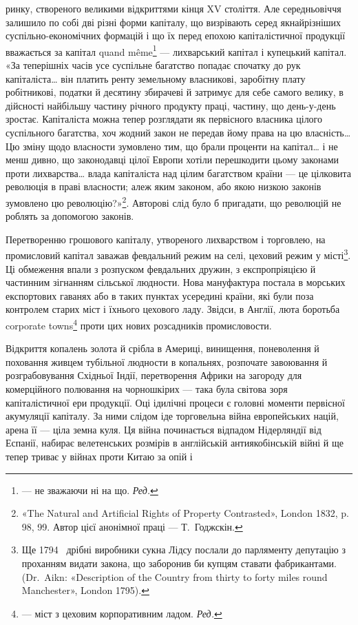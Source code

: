 \parcont{}  %
ринку, створеного великими відкриттями кінця XV століття.
Але середньовіччя залишило по собі дві різні форми капіталу,
що визрівають серед якнайрізніших суспільно-економічних
формацій і що їх перед епохою капіталістичної продукції вважається
за капітал quand même\footnote*{
— не зважаючи ні на що. \emph{Ред.}
} — лихварський капітал і купецький
капітал. «За теперішніх часів усе суспільне багатство
попадає спочатку до рук капіталіста\dots{} він платить ренту земельному
власникові, заробітну плату робітникові, податки й десятину
збирачеві й затримує для себе самого велику, в дійсності
найбільшу частину річного продукту праці, частину, що день-у-день
зростає. Капіталіста можна тепер розглядати як первісного
власника цілого суспільного багатства, хоч жодний закон
не передав йому права на цю власність\dots{} Цю зміну щодо власности
зумовлено тим, що брали проценти на капітал\dots{} і не менш
дивно, що законодавці цілої Европи хотіли перешкодити цьому
законами проти лихварства\dots{} влада капіталіста над цілим багатством
країни — це цілковита революція в праві власности;
алеж яким законом, або якою низкою законів зумовлено цю
революцію?»\footnote{
«The Natural and Artificial Rights of Property Contrasted», London
1832, p. 98, 99. Автор цієї анонімної праці — Т.~Годжскін.
}. Авторові слід було б пригадати, що революцій
не роблять за допомогою законів.

Перетворенню грошового капіталу, утвореного лихварством
і торговлею, на промисловий капітал заважав февдальний режим
на селі, цеховий режим у місті\footnote{
Ще 1794~ дрібні виробники сукна Лідсу послали до парляменту
депутацію з проханням видати закона, що заборонив би купцям ставати
фабрикантами. (Dr.~Aikn: «Description of the Country from thirty to forty
miles round Manchester», London 1795).
}. Ці обмеження впали з розпуском
февдальних дружин, з експропріяцією й частинним зігнанням
сільської людности. Нова мануфактура постала в морських
експортових гаванях або в таких пунктах усередині
країни, які були поза контролем старих міст і їхнього цехового
ладу. Звідси, в Англії, люта боротьба corporate towns\footnote*{
— міст з цеховим корпоративним ладом. \emph{Ред.}
} проти
цих нових розсадників промисловости.

Відкриття копалень золота й срібла в Америці, винищення,
поневолення й поховання живцем тубільної людности в копальнях,
розпочате завоювання й розграбовування Східньої Індії,
перетворення Африки на загороду для комерційного полювання
на чорношкірих — така була світова зоря капіталістичної ери
продукції. Оці ідилічні процеси є головні моменти первісної
акумуляції капіталу. За ними слідом іде торговельна війна европейських
націй, арена її — ціла земна куля. Ця війна починається
відпадом Нідерляндії від Еспанії, набирає велетенських розмірів
в англійській антиякобінській війні й ще тепер триває у війнах
проти Китаю за опій і~
